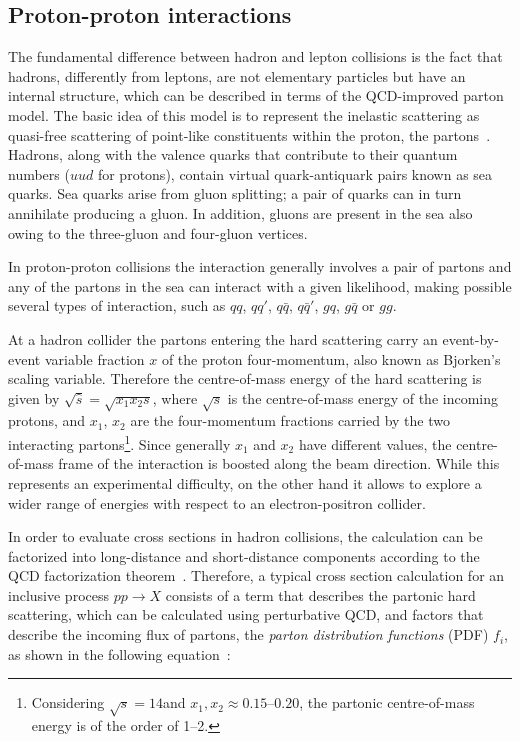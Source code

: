 \subsection{Proton-proton interactions}

The fundamental difference between hadron and lepton collisions is the fact that hadrons, differently from leptons, are not elementary particles but have an internal structure, which can be described in terms of the QCD-improved parton model. The basic idea of this model is to represent the inelastic scattering as quasi-free scattering of point-like constituents within the proton, the partons~\cite{Altarelli:2013tya}. Hadrons, along with the valence quarks that contribute to their quantum numbers ($uud$ for protons), contain virtual quark-antiquark pairs known as sea quarks. Sea quarks arise from gluon splitting; a pair of quarks can in turn annihilate producing a gluon. In addition, gluons are present in the sea also owing to the three-gluon and four-gluon vertices.

In proton-proton collisions the interaction generally involves a pair of partons and any of the partons in the sea can interact with a given likelihood, making possible several types of interaction, such as $qq$, $qq'$, $q\bar{q}$, $q\bar{q}'$, $gq$, $g\bar{q}$ or $gg$.

At a hadron collider the partons entering the hard scattering carry an event-by-event variable fraction $x$ of the proton four-momentum, also known as Bjorken's scaling variable. Therefore the centre-of-mass energy of the hard scattering is given by $\sqrt{\hat{s}} = \sqrt{x_1 x_2 s}$, where $\sqrt{s}$ is the centre-of-mass energy of the incoming protons, and $x_1$, $x_2$ are the four-momentum fractions carried by the two interacting partons\footnote{Considering $\sqrt{s}=14$\TeV and $x_1,x_2 \approx 0.15 \mbox{--} 0.20$, the partonic centre-of-mass energy is of the order of 1--2\TeV.}. Since generally $x_1$ and $x_2$ have different values, the centre-of-mass frame of the interaction is boosted along the beam direction. While this represents an experimental difficulty, on the other hand it allows to explore a wider range of energies with respect to an electron-positron collider.

In order to evaluate cross sections in hadron collisions, the calculation can be factorized into long-distance and short-distance components according to the QCD factorization theorem~\cite{Collins:1989gx}. Therefore, a typical cross section calculation for an inclusive process $pp \to X$ consists of a term that describes the partonic hard scattering, which can be calculated using perturbative QCD, and factors that describe the incoming flux of partons, the \emph{parton distribution functions} (PDF) $f_{i}$, as shown in the following equation~\cite{Butterworth:2012fj}:

